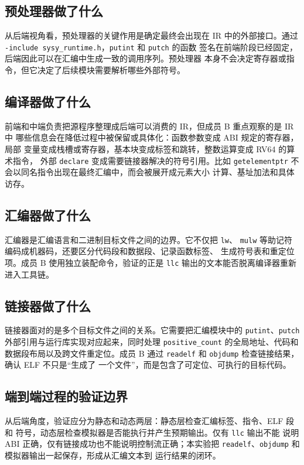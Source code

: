 \documentclass[a4paper]{article}
\begin{document}
\subsection{预处理器做了什么}

从后端视角看，预处理器的关键作用是确定最终会出现在 IR 中的外部接口。通过
\texttt{-include sysy\_runtime.h}，\texttt{putint} 和 \texttt{putch} 的函数
签名在前端阶段已经固定，后端因此可以在汇编中生成一致的调用序列。预处理器
本身不会决定寄存器或指令，但它决定了后续模块需要解析哪些外部符号。

\subsection{编译器做了什么}

前端和中端负责把源程序整理成后端可以消费的 IR，但成员 B 重点观察的是 IR 中
哪些信息会在降低过程中被保留或具体化：函数参数变成 ABI 规定的寄存器，局部
变量变成栈槽或寄存器，基本块变成标签和跳转，整数运算变成 RV64 的算术指令，
外部 \texttt{declare} 变成需要链接器解决的符号引用。比如
\texttt{getelementptr} 不会以同名指令出现在最终汇编中，而会被展开成元素大小
计算、基址加法和具体访存。

\subsection{汇编器做了什么}

汇编器是汇编语言和二进制目标文件之间的边界。它不仅把 \texttt{lw}、
\texttt{mulw} 等助记符编码成机器码，还要区分代码段和数据段、记录函数标签、
生成符号表和重定位项。成员 B 使用独立装配命令，验证的正是
\texttt{llc} 输出的文本能否脱离编译器重新进入工具链。

\subsection{链接器做了什么}

链接器面对的是多个目标文件之间的关系。它需要把汇编模块中的
\texttt{putint}、\texttt{putch} 外部引用与运行库实现对应起来，同时处理
\texttt{positive\_count} 的全局地址、代码和数据段布局以及跨文件重定位。成员 B
通过 \texttt{readelf} 和 \texttt{objdump} 检查链接结果，确认 ELF 不只是“生成了
一个文件”，而是包含了可定位、可执行的目标代码。

\subsection{端到端过程的验证边界}

从后端角度，验证应分为静态和动态两层：静态层检查汇编标签、指令、ELF 段和
符号，动态层检查模拟器是否能执行并产生预期输出。仅有 \texttt{llc} 输出不能
说明 ABI 正确，仅有链接成功也不能说明控制流正确；本实验把
\texttt{readelf}、\texttt{objdump} 和模拟器输出一起保存，形成从汇编文本到
运行结果的闭环。
\end{document}

